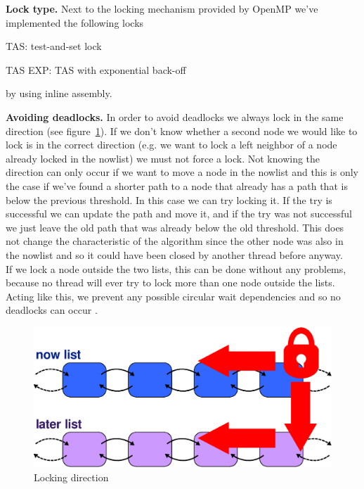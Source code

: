\documentclass[letterpaper]{article}
\newcommand{\mypar}[1]{{\bf #1.}}
\begin{document}
\mypar{Lock type}
Next to the locking mechanism provided by OpenMP we've implemented the following locks
\begin{compactitem}
\item TAS: test-and-set lock
\item TAS EXP: TAS with exponential back-off
\end{compactitem}
by using inline assembly.

\mypar{Avoiding deadlocks}
In order to avoid deadlocks we always lock in the same direction (see figure~\ref{fig:lock}). If we don't know whether a second node we would like to lock is in the correct direction (e.g. we want to lock a left neighbor of a node already locked in the nowlist) we must not force a lock. Not knowing  the direction can only occur if we want to move a node in the nowlist and this is only the case if we've found a shorter path to a node that already has a path that is below the previous threshold. In this case we can try locking it. If the try is successful we can update the path and move it, and if the try was not successful we just leave the old path that was already below the old threshold. This does not change the characteristic of the algorithm since the other node was also in the nowlist and so it could have been closed by another thread before anyway. \\
If we lock a node outside the two lists, this can be done without any problems, because no thread will ever try to lock more than one node outside the lists.\\
Acting like this, we prevent any possible circular wait dependencies and so no deadlocks can occur \cite{Coffman:71}.

\begin{figure}[h]\centering
  \includegraphics[scale=0.38]{locking.eps}
  \caption{Locking direction \label{fig:lock}}
\end{figure}
\end{document}
